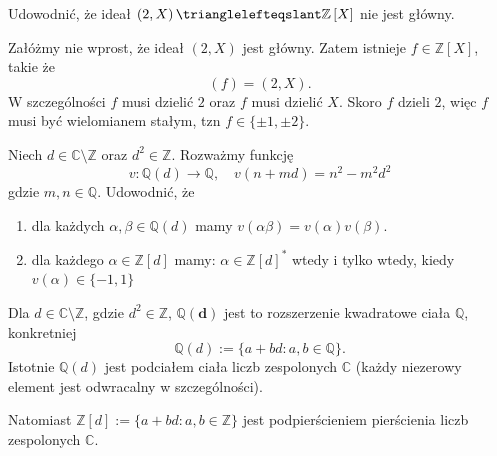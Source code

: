 \begin{problem}[5]
	Udowodnić, że ideał $\left( 2, X \right) \trianglelefteqslant \mathbb{Z} \left[ X \right] $ nie jest główny.
\end{problem} 
\begin{solution}
	Załóżmy nie wprost, że ideał $\left(2, X\right) $ jest główny. Zatem istnieje $f \in \mathbb{Z} \left[ X \right]$, takie że
	 \[
		 \left( f \right) = \left( 2, X \right) 
	.\] 
	W szczególności $f$ musi dzielić $2$ oraz $f$ musi dzielić  $X$. Skoro  $f$ dzieli  $2$, więc  $f$ musi być wielomianem stałym, tzn $f \in \{\pm 1, \pm 2\}$.
\end{solution} 
\begin{problem}[6]
	Niech $d\in \mathbb{C} \setminus \mathbb{Z} $ oraz $d^2\in \mathbb{Z} $. Rozważmy funkcję
	\[
	v: \mathbb{Q} \left( d \right) \to \mathbb{Q}, \quad v\left( n + md \right) = n^2 -m^2d^2
	\] 
	gdzie $m,n \in \mathbb{Q}.$ Udowodnić, że 
	\begin{enumerate}[label=\alph*)]
		\item dla każdych $\alpha , \beta  \in \mathbb{Q} \left( d \right) $ mamy $v\left(\alpha\beta\right) = v\left( \alpha  \right) v\left( \beta  \right) $.
		\item dla każdego $\alpha \in \mathbb{Z} \left[ d \right]$ mamy: $\alpha \in \mathbb{Z} \left[d \right] ^{\ast} $ wtedy i tylko wtedy, kiedy $v\left( \alpha  \right)  \in \{-1, 1\} $
	\end{enumerate}
\end{problem} 
\begin{note}

	Dla  $d\in \mathbb{C} \setminus \mathbb{Z} $, gdzie $d^2\in \mathbb{Z} $, $\bm{ \mathbb{Q} \left( d \right)  } $ jest to rozszerzenie kwadratowe ciała $\mathbb{Q} $, konkretniej
	\[
	 \mathbb{Q} \left( d \right) := \{a + bd: a,b \in \mathbb{Q} \} 
	.\] 
	Istotnie $\mathbb{Q} \left( d \right) $ jest podciałem ciała liczb zespolonych $\mathbb{C} $ (każdy niezerowy element jest odwracalny w szczególności).

	Natomiast $\mathbb{Z} \left[ d \right] := \{a + bd: a,b \in \mathbb{Z} \}$ jest podpierścieniem pierścienia liczb zespolonych $\mathbb{C} $.


\end{note}
